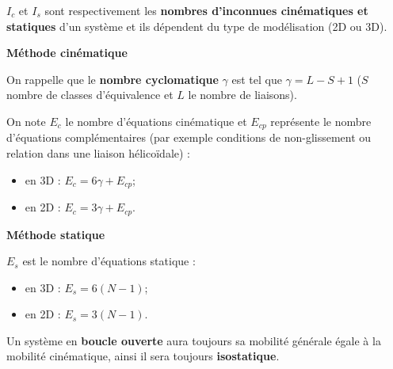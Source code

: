 \documentclass[10pt,fleqn]{article} %
\begin{document}
\begin{definition}[Notations]

$I_c$ et $I_s$ sont respectivement les \textbf{nombres d'inconnues cinématiques et statiques} d'un système et ils dépendent du type de modélisation (2D ou 3D).




\vspace{-.6cm}

\begin{multicols}{2}
\begin{center}
\textbf{Méthode cinématique}
\end{center}


On rappelle que le \textbf{nombre cyclomatique}  $\gamma$
est tel que $\gamma=L-S+1$ ($S$ nombre de classes d'équivalence et $L$ le nombre de liaisons).

On note $E_c$ le nombre d'équations cinématique et $E_{cp}$ représente le nombre d'équations complémentaires (par exemple conditions de non-glissement ou relation dans une liaison hélicoïdale) :
\begin{itemize}
 \item en 3D : $E_c=6\gamma+E_{cp}$;
 \item en 2D : $E_c=3\gamma+E_{cp}$.
\end{itemize}

\vfill\null
\columnbreak

\begin{center}
\textbf{Méthode statique} 
\end{center}


$E_s$ est le nombre d'équations statique :
				\begin{itemize}
					\item en 3D : $E_s=6 (N-1)$;
					\item en 2D : $E_s=3 (N-1)$.
				\end{itemize}


\end{multicols}



		
\end{definition}

\begin{rem}
Un système en \textbf{boucle ouverte} aura toujours sa mobilité générale égale à la mobilité cinématique, ainsi il sera toujours \textbf{isostatique}.
\end{rem}
\end{document}
